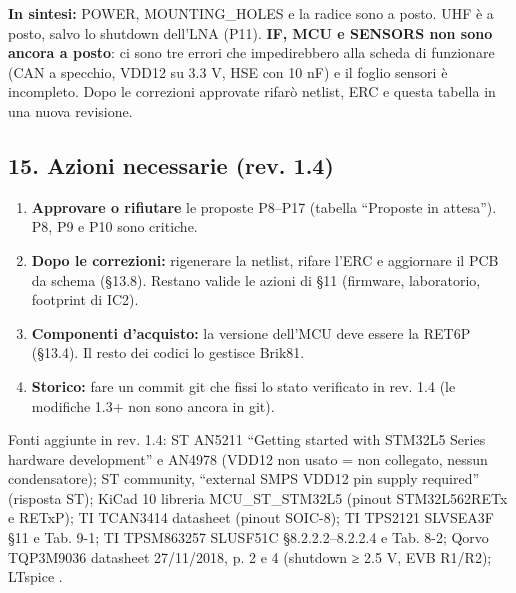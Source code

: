\textbf{In sintesi:} POWER, MOUNTING\_\allowbreak{}HOLES e la radice sono a posto. UHF è a posto, salvo lo shutdown dell'LNA (P11). \textbf{IF, MCU e SENSORS non sono ancora a posto}: ci sono tre errori che impedirebbero alla scheda di funzionare (CAN a specchio, VDD12 su 3.3 V, HSE con 10 nF) e il foglio sensori è incompleto. Dopo le correzioni approvate rifarò netlist, ERC e questa tabella in una nuova revisione.

\subsection[15. Azioni necessarie (rev. 1.4)]{15. Azioni necessarie (rev. 1.4)}

\begin{enumerate}
\item \textbf{Approvare o rifiutare} le proposte P8–P17 (tabella \textquotedblleft{}Proposte in attesa\textquotedblright{}). P8, P9 e P10 sono critiche.
\item \textbf{Dopo le correzioni:} rigenerare la netlist, rifare l'ERC e aggiornare il PCB da schema (§13.8). Restano valide le azioni di §11 (firmware, laboratorio, footprint di IC2).
\item \textbf{Componenti d'acquisto:} la versione dell'MCU deve essere la RET6P (§13.4). Il resto dei codici lo gestisce Brik81.
\item \textbf{Storico:} fare un commit git che fissi lo stato verificato in rev. 1.4 (le modifiche 1.3+ non sono ancora in git).
\end{enumerate}

{\small Fonti aggiunte in rev. 1.4: ST AN5211 \textquotedblleft{}Getting started with STM32L5 Series hardware development\textquotedblright{} e AN4978 (VDD12 non usato = non collegato, nessun condensatore); ST community, \textquotedblleft{}external SMPS VDD12 pin supply required\textquotedblright{} (risposta ST); KiCad 10 libreria MCU\_\allowbreak{}ST\_\allowbreak{}STM32L5 (pinout STM32L562RETx e RETxP); TI TCAN3414 datasheet (pinout SOIC-8); TI TPS2121 SLVSEA3F §11 e Tab. 9-1; TI TPSM863257 SLUSF51C §8.2.2.2–8.2.2.4 e Tab. 8-2; Qorvo TQP3M9036 datasheet 27/\allowbreak{}11/\allowbreak{}2018, p. 2 e 4 (shutdown ≥ 2.5 V, EVB R1/\allowbreak{}R2); LTspice .}
